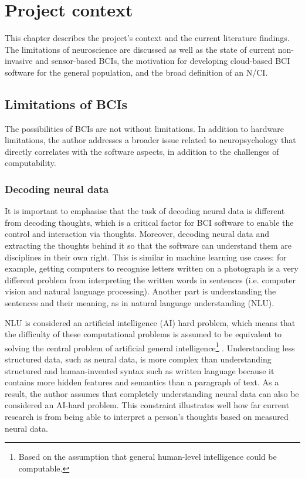 \chapter{Project context}
\graphicspath{{Chapter2/Figs/}{Chapter2/Figs/}}

This chapter describes the project’s context and the current literature findings. The limitations of neuroscience are discussed as well as the state of current non-invasive and sensor-based BCIs, the motivation for developing cloud-based BCI software for the general population, and the broad definition of an N/CI.

\section{Limitations of BCIs}
\label{chapter2-limitations-of-bcis}

The possibilities of BCIs are not without limitations. In addition to hardware limitations, the author addresses a broader issue related to neuropsychology that directly correlates with the software aspects, in addition to the challenges of computability.

\subsection{Decoding neural data}
\label{chapter2-decoding-neural-data}

It is important to emphasise that the task of decoding neural data is different from decoding thoughts, which is a critical factor for BCI software to enable the control and interaction via thoughts. Moreover, decoding neural data and extracting the thoughts behind it so that the software can understand them are disciplines in their own right. This is similar in machine learning use cases: for example, getting computers to recognise letters written on a photograph is a very different problem from interpreting the written words in sentences (i.e. computer vision and natural language processing). Another part is understanding the sentences and their meaning, as in natural language understanding (NLU).

NLU is considered an artificial intelligence (AI) hard problem, which means that the difficulty of these computational problems is assumed to be equivalent to solving the central problem of artificial general intelligence\footnote{Based on the assumption that general human-level intelligence could be computable.} \citep{demasi_theoretical_2010}. Understanding less structured data, such as neural data, is more complex than understanding structured and human-invented syntax such as written language because it contains more hidden features and semantics than a paragraph of text. As a result, the author assumes that completely understanding neural data can also be considered an AI-hard problem. This constraint illustrates well how far current research is from being able to interpret a person’s thoughts based on measured neural data.

